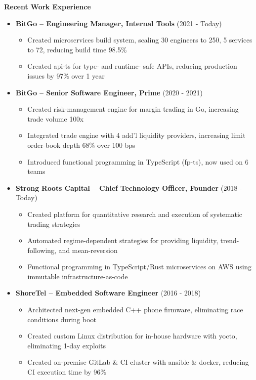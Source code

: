 \documentclass{report}
\begin{document}
\textbf{Recent Work Experience}
\begin{itemize}[label=]

\item \textbf{BitGo -- Engineering Manager, Internal Tools} (2021 - Today)
  \begin{itemize}[label=$\circ$]
  \item Created microservices build system, scaling 30 engineers to 250, 5 services to 72, reducing build time 98.5\%
  \item Created api-ts for type- and runtime- safe APIs, reducing production issues by 97\% over 1 year
  \end{itemize}

\item \textbf{BitGo -- Senior Software Engineer, Prime} (2020 - 2021)
  \begin{itemize}[label=$\circ$]
  \item Created risk-management engine for margin trading in Go, increasing trade volume 100x
  \item Integrated trade engine with 4 add'l liquidity providers, increasing limit order-book depth 68\% over 100 bps
  \item Introduced functional programming in TypeScript (fp-ts), now used on 6 teams
  \end{itemize}

\item \textbf{Strong Roots Capital -- Chief Technology Officer, Founder} (2018 - Today)
  \begin{itemize}[label=$\circ$]
  \item Created platform for quantitative research and execution of systematic trading strategies
  \item Automated regime-dependent strategies for providing liquidity, trend-following, and mean-reversion
  \item Functional programming in TypeScript/Rust microservices on AWS using immutable infrastructure-as-code
  \end{itemize}

\item \textbf{ShoreTel -- Embedded Software Engineer} (2016 - 2018)
  \begin{itemize}[label=$\circ$]
  \item Architected next-gen embedded C++ phone firmware, eliminating race conditions during boot
  \item Created custom Linux distribution for in-house hardware with yocto, eliminating 1-day exploits
  \item Created on-premise GitLab \& CI cluster with ansible \& docker, reducing CI execution time by 96\%
  \end{itemize}


\end{itemize}
\end{document}
